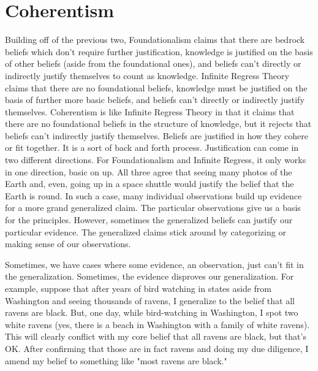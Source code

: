 \section{Coherentism}
Building off of the previous two, Foundationalism claims that there are bedrock beliefs which don't require further justification, knowledge is justified on the basis of other beliefs (aside from the foundational ones), and beliefs can't directly or indirectly justify themselves to count as knowledge. Infinite Regress Theory claims that there are no foundational beliefs, knowledge must be justified on the basis of further more basic beliefs, and beliefs can't directly or indirectly justify themselves.  Coherentism is like Infinite Regress Theory in that it claims that there are no foundational beliefs in the structure of knowledge, but it rejects that beliefs can't indirectly justify themselves. Beliefs are justified in how they cohere or fit together. It is a sort of back and forth process. Justification can come in two different directions. For Foundationalism and Infinite Regress, it only works in one direction, basic on up. All three agree that seeing many photos of the Earth and, even, going up in a space shuttle would justify the belief that the Earth is round. In such a case, many individual observations build up evidence for a more grand generalized claim. The particular observations give us a basis for the principles. However, sometimes the generalized beliefs can justify our particular evidence. The generalized claims stick around by categorizing or making sense of our observations.

Sometimes, we have cases where some evidence, an observation, just can't fit in the generalization. Sometimes, the evidence disproves our generalization. For example, suppose that after years of bird watching in states aside from Washington and seeing thousands of ravens, I generalize to the belief that all ravens are black. But, one day, while bird-watching in Washington, I spot two white ravens (yes, there is a beach in Washington with a family of white ravens). This will clearly conflict with my core belief that all ravens are black, but that's OK. After confirming that those are in fact ravens and doing my due diligence, I amend my belief to something like "most ravens are black."

